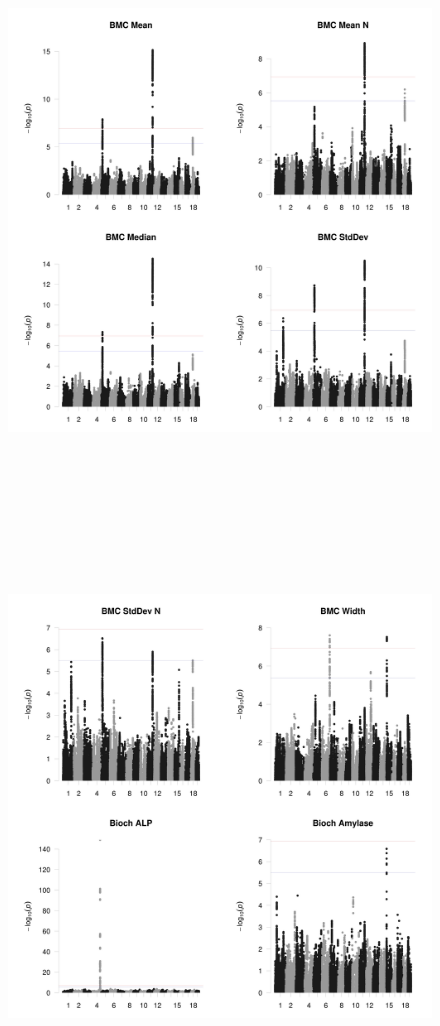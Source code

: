 \documentclass{article}
\begin{document}
\begin{figure}
\begin{center}
\includegraphics[width=15cm, height=15cm]{5.jpeg}
\end{center}
\end{figure}


\begin{figure}
\begin{center}
\includegraphics[width=15cm, height=15cm]{9.jpeg}
\end{center}
\end{figure}
\end{document}
